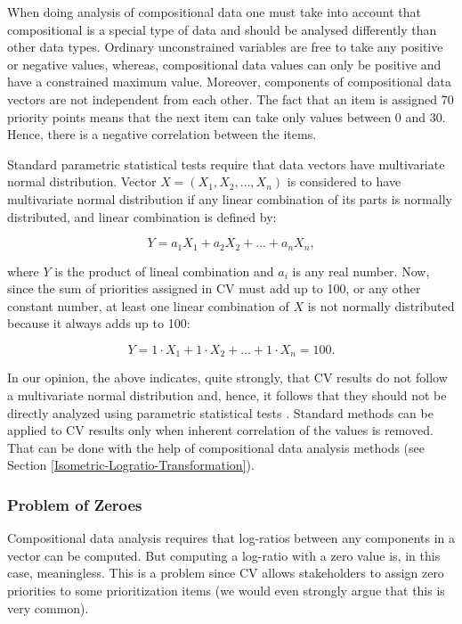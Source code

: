
When doing analysis of compositional data one must take into account that compositional is a special type of data and should be analysed differently than other data types.
Ordinary unconstrained variables are free to take any positive or negative values,
whereas, compositional data values can only be positive and have a constrained maximum value.
Moreover, components of compositional data vectors are not independent from each other.
The fact that an item is assigned 70 priority points means that the next item can take only values between 0 and 30.
Hence, there is a negative correlation between the items.

Standard parametric statistical tests require that data vectors have multivariate normal distribution.
Vector $X=(X_{1}, X_{2}, \ldots, X_{n})$
is considered to have multivariate normal distribution if any linear
combination of its parts is normally distributed, and linear combination
is defined by:

\begin{equation}
	Y=a_{1}X_{1}+a_{2}X_{2}+\ldots+a_{n}X_{n},
\end{equation}

where $Y$ is the product of lineal combination and $a_{i}$ is any
real number. Now, since the sum of priorities assigned in CV must add up
to 100, or any other constant number, at least one linear combination
of $X$ is not normally distributed because it always adds up to
100:

\begin{equation}
	Y=1\cdot X_{1}+1\cdot X_{2}+\ldots+1\cdot X_{n}=100.
\end{equation}

In our opinion, the above indicates, quite strongly,
that CV results do not follow a multivariate normal distribution 
and, hence, it follows that they should not be directly analyzed using parametric statistical tests \cite{Pawlowsky-Glahn2006}.
Standard methods can be applied to CV results only when inherent correlation of the values is removed.
That can be done with the help of compositional data analysis methods (see Section \ref{Isometric-Logratio-Transformation}).

\subsubsection{\label{Problem-of-Zeroes}Problem of Zeroes}
Compositional data analysis requires that log-ratios between any components in a vector can be
computed. But computing a log-ratio with a zero value is, in this case, meaningless. This is
a problem since CV allows stakeholders to assign zero priorities
to some prioritization items (we would even strongly argue that this is very common). 

